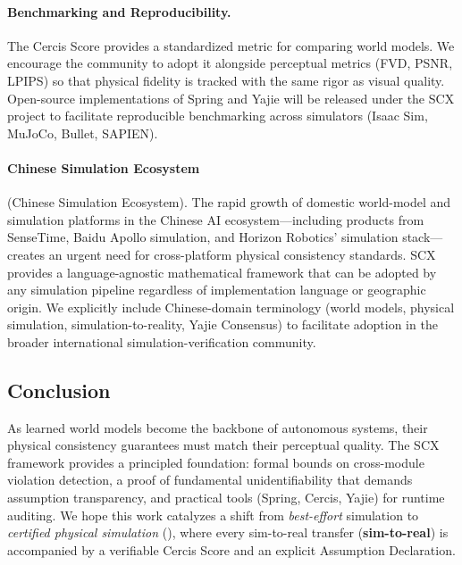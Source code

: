 \documentclass[11pt,twocolumn]{article}
\theoremstyle{definition}
\begin{document}
\paragraph{Benchmarking and Reproducibility.}
The Cercis Score provides a standardized metric for comparing world models.
We encourage the community to adopt it alongside perceptual metrics (FVD,
PSNR, LPIPS) so that physical fidelity is tracked with the same rigor as
visual quality.  Open-source implementations of Spring and Yajie will be
released under the SCX project to facilitate reproducible benchmarking
across simulators (Isaac Sim, MuJoCo, Bullet, SAPIEN).

\paragraph{Chinese Simulation Ecosystem}
(Chinese Simulation Ecosystem).
The rapid growth of domestic world-model and simulation platforms in the
Chinese AI ecosystem---including products from SenseTime, Baidu Apollo
simulation, and Horizon Robotics' simulation stack---creates an urgent need
for cross-platform physical consistency standards.  SCX provides a
language-agnostic mathematical framework that can be adopted by any
simulation pipeline regardless of implementation language or geographic
origin.  We explicitly include Chinese-domain terminology
(world models, physical simulation, simulation-to-reality,
Yajie Consensus) to facilitate adoption in the broader international
simulation-verification community.

\subsection{Conclusion}

As learned world models become the backbone of
autonomous systems, their physical consistency guarantees must match their
perceptual quality.  The SCX framework provides a principled foundation:
formal bounds on cross-module violation detection, a proof of fundamental
unidentifiability that demands assumption transparency, and practical tools
(Spring, Cercis, Yajie) for runtime auditing.  We hope this work catalyzes a
shift from \emph{best-effort} simulation to \emph{certified physical
simulation} (\textbf{}), where every sim-to-real transfer
(\textbf{sim-to-real}) is accompanied by a verifiable Cercis Score and an
explicit Assumption Declaration.

\appendix
\end{document}
